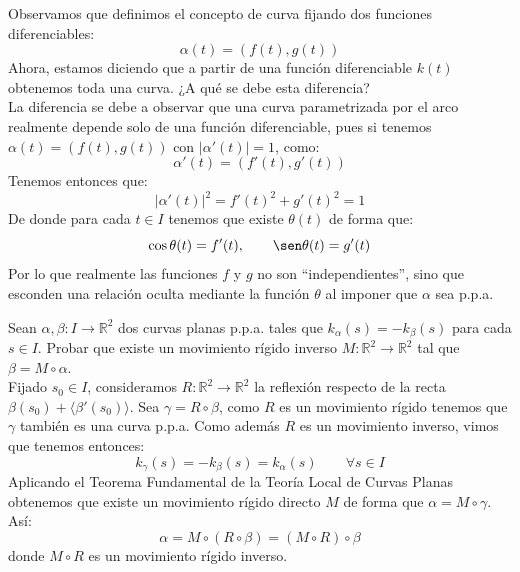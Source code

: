 \begin{ejercicio}
    Observamos que definimos el concepto de curva fijando dos funciones diferenciables:
    \begin{equation*}
        \alpha(t) = (f(t),g(t))
    \end{equation*}
    Ahora, estamos diciendo que a partir de una función diferenciable $k(t)$ obtenemos toda una curva. ¿A qué se debe esta diferencia?\\

    \noindent
    La diferencia se debe a observar que una curva parametrizada por el arco realmente depende solo de una función diferenciable, pues si tenemos $\alpha(t) = (f(t),g(t))$ con $|\alpha'(t)| = 1$, como:
    \begin{equation*}
        \alpha'(t) = (f'(t),g'(t))
    \end{equation*}
    Tenemos entonces que:
    \begin{equation*}
        |\alpha'(t)|^2 = f'(t)^2 + g'(t)^2 = 1 
    \end{equation*}
    De donde para cada $t\in I$ tenemos que existe $\theta(t)$ de forma que:
    \begin{equation*}
        \cos\theta(t) = f'(t), \qquad \sen\theta(t) = g'(t)
    \end{equation*}
    Por lo que realmente las funciones $f$ y $g$ no son ``independientes'', sino que esconden una relación oculta mediante la función $\theta$ al imponer que $\alpha$ sea p.p.a.
\end{ejercicio}

\begin{ejercicio}
    Sean $\alpha,\beta:I\to\mathbb{R}^2$ dos curvas planas p.p.a. tales que $k_\alpha(s)= -k_\beta(s)$ para cada $s\in I$. Probar que existe un movimiento rígido inverso $M:\mathbb{R}^2\to\mathbb{R}^2$ tal que $\beta = M\circ \alpha$.\\

    \noindent
    Fijado $s_0\in I$, consideramos $R:\mathbb{R}^2\to\mathbb{R}^2$  la reflexión respecto de la recta $\beta(s_0)+\langle \beta'(s_0) \rangle $. Sea $\gamma = R\circ \beta$, como $R$ es un movimiento rígido tenemos que $\gamma$ también es una curva p.p.a. Como además $R$ es un movimiento inverso, vimos que tenemos entonces:
    \begin{equation*}
        k_\gamma(s) = -k_\beta(s) = k_\alpha(s) \qquad \forall s\in I
    \end{equation*}
    Aplicando el Teorema Fundamental de la Teoría Local de Curvas Planas obtenemos que existe un movimiento rígido directo $M$ de forma que $\alpha = M\circ \gamma$. Así:
    \begin{equation*}
        \alpha = M\circ (R \circ \beta) = (M\circ R) \circ \beta
    \end{equation*}
    donde $M\circ R$ es un movimiento rígido inverso.
\end{ejercicio}

